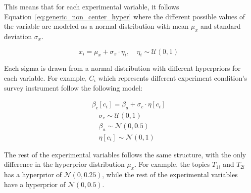 This means that for each experimental variable, it follows Equation~\ref{eq:generic_non_center_hyper} where the different possible values of the variable are modeled as a normal distribution with mean $\mu_x$ and standard deviation $\sigma_x$.

\begin{equation}
    \label{eq:generic_non_center_hyper}
    x_i = \mu_x + \sigma_x \cdot \eta_i, \quad \eta_i \sim \mathcal{U}(0,1)
\end{equation}

Each sigma is drawn from a normal distribution with different hyperpriors for each variable. For example, $C_i$ which represents different experiment condition's survey instrument follow the following model:

\begin{align}
    \label{eq:generic_non_center_hyper_C}
    \beta_c[c_i] = \beta_a + \sigma_c \cdot \eta[c_i]\\
    \quad \sigma_c \sim \mathcal{U}(0,1)\\
    \quad \beta_a \sim \mathcal{N}(0, 0.5)\\
    \quad \eta[c_i] \sim \mathcal{N}(0, 1)
\end{align}

The rest of the experimental variables follows the same structure, with the only difference in the hyperprior distribution $\mu_x$. For example, the topics $T_{1i}$ and $T_{2i}$ has a hyperprior of $\mathcal{N}(0, 0.25)$, while the rest of the experimental variables have a hyperprior of $\mathcal{N}(0, 0.5)$. 